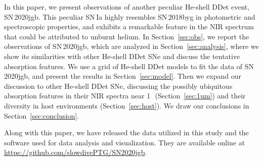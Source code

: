 \documentclass[twocolumn]{aastex631}
\newcommand{\sn}{SN\,2020jgb}
\newcommand{\Mch}{$M_\mathrm{Ch}$}
\begin{document}

In this paper, we present observations of another peculiar He-shell DDet event, \sn. This peculiar SN\,Ia highly resembles SN\,2018byg in photometric and spectroscopic properties, and exhibits a remarkable feature in the NIR spectrum that could be attributed to unburnt helium. In Section~\ref{sec:obs}, we report the observations of \sn, which are analyzed in Section~\ref{sec:analysis}, where we show its similarities with other He-shell DDet SNe and discuss the tentative  absorption features. We use a grid of He-shell DDet models to fit the data of \sn, and present the results in Section~\ref{sec:model}. Then we expand our discussion to other He-shell DDet SNe, discussing the possibly ubiquitous absorption features in their NIR spectra near 1\,\micron\ (Section~\ref{sec:1um}) and their diversity in host environments (Section~\ref{sec:host}). We draw our conclusions in Section~\ref{sec:conclusion}.

Along with this paper, we have released the data utilized in this study and the software used for data analysis and visualization. They are available online at \url{https://github.com/slowdivePTG/SN2020jgb}.
\end{document}
